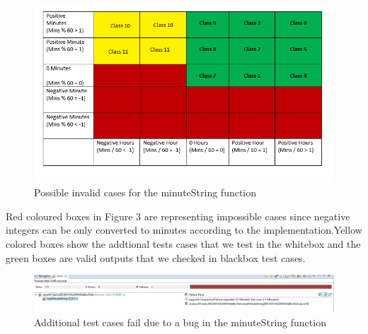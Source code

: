\documentclass[fontsize=12pt,paper=letter,twoside]{scrartcl}
\begin{document}
\begin{itemize}
\begin{figure}[!htb]
\begin{center}
\includegraphics[width=.99\textwidth]{images/wbt/ect/wbtmatrix.png}
\end{center}
\caption{Possible invalid cases for the minuteString function}
\label{fig:wbt_ect_cfg}
\end{figure}
Red coloured boxes in Figure 3 are representing impossible cases since negative integers can be only converted to minutes according to the implementation.Yellow colored boxes show the addtional tests cases that we test in the whitebox and the green boxes are valid outputs that we checked in blackbox test cases.

\begin{figure}[!htb]
\begin{center}
\includegraphics[width=.99\textwidth]{images/wbt/ect/bug.png}
\end{center}
\caption{Additional test cases fail due to a bug in the minuteString function}
\label{fig:wbt_ect_bug}
\end{figure}
\newpage
\newpage


\end{itemize}
\end{document}
